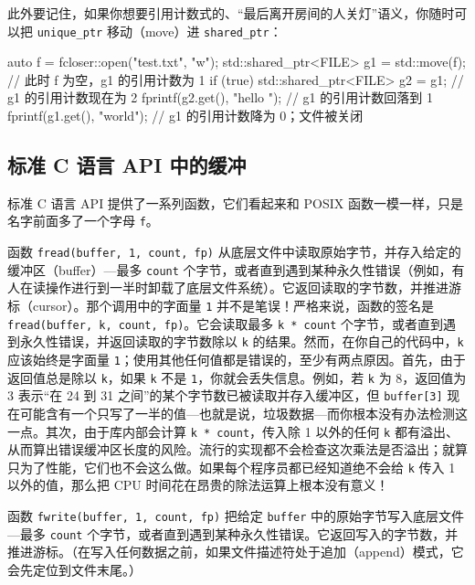 此外要记住，如果你想要引用计数式的、“最后离开房间的人关灯”语义，你随时可以把 \texttt{unique\_\allowbreak{}ptr} 移动（move）进 \texttt{shared\_\allowbreak{}ptr}：

\begin{codebox}[cpp]
    auto f = fcloser::open("test.txt", "w");
    std::shared_ptr<FILE> g1 = std::move(f);
      // 此时 f 为空，g1 的引用计数为 1
    if (true) {
      std::shared_ptr<FILE> g2 = g1;
        // g1 的引用计数现在为 2
      fprintf(g2.get(), "hello ");
        // g1 的引用计数回落到 1
    }
    fprintf(g1.get(), "world\n");
      // g1 的引用计数降为 0；文件被关闭
\end{codebox}

\subsection{标准 C 语言 API 中的缓冲}

标准 C 语言 API 提供了一系列函数，它们看起来和 POSIX 函数一模一样，只是名字前面多了一个字母 \texttt{f}。

函数 \texttt{fread(\allowbreak{}buffer,\allowbreak{} 1,\allowbreak{} count,\allowbreak{} fp)\allowbreak{}} 从底层文件中读取原始字节，并存入给定的缓冲区（buffer）—最多 \texttt{count} 个字节，或者直到遇到某种永久性错误（例如，有人在读操作进行到一半时卸载了底层文件系统）。它返回读取的字节数，并推进游标（cursor）。那个调用中的字面量 \texttt{1} 并不是笔误！严格来说，函数的签名是 \texttt{fread(\allowbreak{}buffer,\allowbreak{} k,\allowbreak{} count,\allowbreak{} fp)\allowbreak{}}。它会读取最多 \texttt{k * count} 个字节，或者直到遇到永久性错误，并返回读取的字节数除以 \texttt{k} 的结果。然而，在你自己的代码中，\texttt{k} 应该始终是字面量 \texttt{1}；使用其他任何值都是错误的，至少有两点原因。首先，由于返回值总是除以 \texttt{k}，如果 \texttt{k} 不是 \texttt{1}，你就会丢失信息。例如，若 \texttt{k} 为 8，返回值为 3 表示“在 24 到 31 之间”的某个字节数已被读取并存入缓冲区，但 \texttt{buffer[3]} 现在可能含有一个只写了一半的值—也就是说，垃圾数据—而你根本没有办法检测这一点。其次，由于库内部会计算 \texttt{k * count}，传入除 1 以外的任何 \texttt{k} 都有溢出、从而算出错误缓冲区长度的风险。流行的实现都不会检查这次乘法是否溢出；就算只为了性能，它们也不会这么做。如果每个程序员都已经知道绝不会给 \texttt{k} 传入 1 以外的值，那么把 CPU 时间花在昂贵的除法运算上根本没有意义！

函数 \texttt{fwrite(\allowbreak{}buffer,\allowbreak{} 1,\allowbreak{} count,\allowbreak{} fp)\allowbreak{}} 把给定 \texttt{buffer} 中的原始字节写入底层文件—最多 \texttt{count} 个字节，或者直到遇到某种永久性错误。它返回写入的字节数，并推进游标。（在写入任何数据之前，如果文件描述符处于追加（append）模式，它会先定位到文件末尾。）

